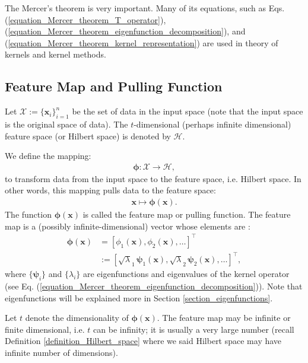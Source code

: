 \documentclass[lang=cn,10pt]{gorgeousnbook}
\numberwithin{equation}{section}%
\numberwithin{figure}{section}%
\begin{document}
The Mercer's theorem is very important. Many of its equations, such as Eqs. (\ref{equation_Mercer_theorem_T_operator}), (\ref{equation_Mercer_theorem_eigenfunction_decomposition}), and (\ref{equation_Mercer_theorem_kernel_representation}) are used in theory of kernels and kernel methods. 

\subsection{Feature Map and Pulling Function}\label{section_feature_map}

Let $\mathcal{X} := \{\boldsymbol{x}_i\}_{i=1}^n$ be the set of data in the input space (note that the input space is the original space of data). The $t$-dimensional (perhaps infinite dimensional) feature space (or Hilbert space) is denoted by $\mathcal{H}$. 

\begin{definition}
We define the mapping:
\begin{align}
\boldsymbol{\phi}: \mathcal{X} \rightarrow \mathcal{H}, 
\end{align}
to transform data from the input space to the feature space, i.e. Hilbert space. In other words, this mapping pulls data to the feature space:
\begin{align}\label{equation_pulling_mapping}
\boldsymbol{x} \mapsto \boldsymbol{\phi}(\boldsymbol{x}).
\end{align}
The function $\boldsymbol{\phi}(\boldsymbol{x})$ is called the feature map or pulling function. 
The feature map is a (possibly infinite-dimensional) vector whose elements are \cite{minh2006mercer}:
\begin{equation}\label{equation_feature_map}
\begin{aligned}
\boldsymbol{\phi}(\boldsymbol{x}) &= [\phi_1(\boldsymbol{x}), \phi_2(\boldsymbol{x}), \dots]^\top \\
&:= [\sqrt{\lambda}_1\, \boldsymbol{\psi}_1(\boldsymbol{x}), \sqrt{\lambda}_2\, \boldsymbol{\psi}_2(\boldsymbol{x}), \dots]^\top,
\end{aligned}
\end{equation}
where $\{\boldsymbol{\psi}_i\}$ and $\{\lambda_i\}$ are eigenfunctions and eigenvalues of the kernel operator (see Eq. (\ref{equation_Mercer_theorem_eigenfunction_decomposition})). Note that eigenfunctions will be explained more in Section \ref{section_eigenfunctions}.
\end{definition}
Let $t$ denote the dimensionality of $\boldsymbol{\phi}(\boldsymbol{x})$.
The feature map may be infinite or finite dimensional, i.e. $t$ can be infinity; it is usually a very large number (recall Definition \ref{definition_Hilbert_space} where we said Hilbert space may have infinite number of dimensions). 
\end{document}
